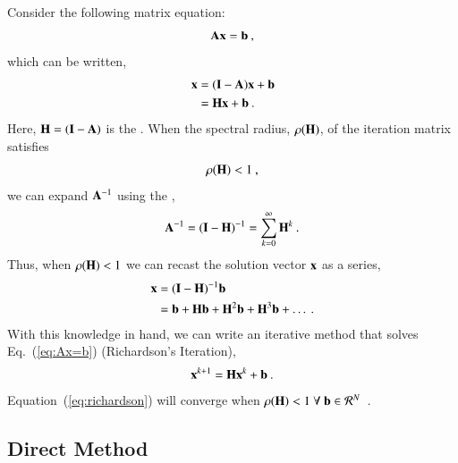 \documentclass[preprint,12pt]{elsarticle}
\newcommand{\vA}{\ensuremath{\ve{A}}}
\newcommand{\vb}{\ensuremath{\ve{b}}}
\newcommand{\vx}{\ensuremath{\ve{x}}}
\newcommand{\vI}{\ensuremath{\ve{I}}}
\newcommand{\vH}{\ensuremath{\ve{H}}}
\begin{document}
Consider the following matrix equation:
\begin{equation}
  \vA\vx = \vb\:,
  \label{eq:Ax=b}
\end{equation}
which can be written,
\begin{equation}
  \begin{split}
    \vx &= (\vI - \vA)\vx + \vb\\
    &= \vH\vx + \vb\:.
  \end{split}
  \label{eq:point_iteration}
\end{equation}
Here, $\vH = (\vI - \vA)$ is the .  When the
spectral radius, $\rho(\vH)$, of the iteration matrix satisfies
\begin{equation}
  \rho(\vH) < 1\:,
\end{equation}
we can expand $\vA^{-1}$ using the ,
\begin{equation}
  \vA^{-1} = (\vI - \vH)^{-1} =  \sum_{k=0}^{\infty} \vH^k\:.
\end{equation} 
Thus, when $\rho(\vH) < 1$ we can recast the solution vector $\vx$ as
a series,
\begin{equation}
  \begin{split}
    \vx &= (\vI - \vH)^{-1}\vb\\
    &= \vb + \vH\vb + \vH^2\vb + \vH^3\vb + \ldots\:.
    \label{eq:neumann_series}
  \end{split}
\end{equation}
With this knowledge in hand, we can write an iterative method that
solves Eq.~(\ref{eq:Ax=b}) (Richardson's Iteration),
\begin{equation}
  \vx^{k+1} = \vH\vx^k + \vb\:.
  \label{eq:richardson}
\end{equation}
Equation~(\ref{eq:richardson}) will converge when $\rho(\vH) < 1\ 
\forall\ \vb \in \mathcal{R}^{N}$~\cite{kelley_1995}.

\subsection{Direct Method}
\label{sec:direct-method}
\end{document}
